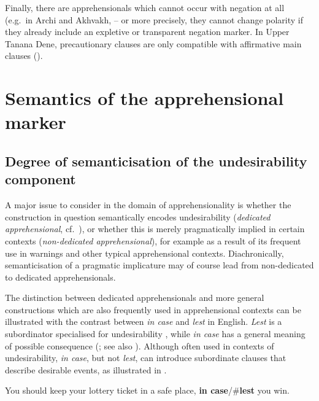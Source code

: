 \documentclass[output=paper,colorlinks,citecolor=brown
]{langscibook}
\begin{document}
Finally, there are apprehensionals which cannot occur with negation at all (e.g.\ in Archi and Akhvakh,  -- or more precisely, they cannot change polarity if they already include an expletive or transparent negation marker. In Upper Tanana Dene, precautionary clauses are only compatible with affirmative main clauses (\citealt{chapters/lovick}).



\section{Semantics of the apprehensional marker}
\label{sec:semantics}

\subsection{Degree of semanticisation of the undesirability component}
\label{subsec:undesirability}


A major issue to consider in the domain of apprehensionality is whether the construction in question semantically encodes undesirability (\textit{dedicated apprehensional}, cf.\ ), or whether this is merely pragmatically implied in certain contexts (\textit{non-dedicated apprehensional}), for example as a result of its frequent use in warnings and other typical apprehensional contexts. Diachronically, semanticisation of a pragmatic implicature may of course lead from non-dedicated to dedicated apprehensionals.

The distinction between dedicated apprehensionals and more general constructions which are also frequently used in apprehensional contexts can be illustrated with the contrast between \textit{in case} and \textit{lest} in English. \textit{Lest} is a subordinator specialised for undesirability \citep{lópezcouso2007}, while \textit{in case} has a general meaning of possible consequence (\cite[23--25]{dixon2009}; see also ). Although often used in contexts of undesirability, \textit{in case}, but not \textit{lest}, can introduce subordinate clauses that describe desirable events, as illustrated in .

\ea\label{ex:intro14} You should keep your lottery ticket in a safe place, \textbf{in case}/\#\textbf{lest} you win.
\z
\end{document}
